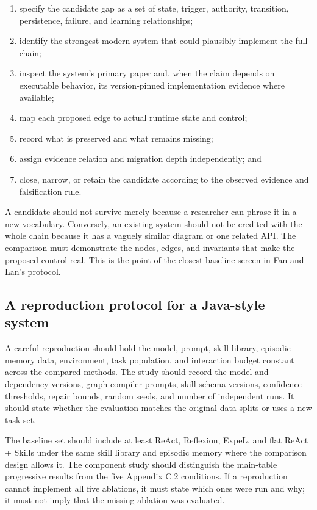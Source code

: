 \begin{enumerate}
  \item specify the candidate gap as a set of state, trigger, authority, transition, persistence, failure, and learning relationships;
  \item identify the strongest modern system that could plausibly implement the full chain;
  \item inspect the system's primary paper and, when the claim depends on executable behavior, its version-pinned implementation evidence where available;
  \item map each proposed edge to actual runtime state and control;
  \item record what is preserved and what remains missing;
  \item assign evidence relation and migration depth independently; and
  \item close, narrow, or retain the candidate according to the observed evidence and falsification rule.
\end{enumerate}

A candidate should not survive merely because a researcher can phrase it in a new vocabulary. Conversely, an existing system should not be credited with the whole chain because it has a vaguely similar diagram or one related API. The comparison must demonstrate the nodes, edges, and invariants that make the proposed control real. This is the point of the closest-baseline screen in Fan and Lan's protocol.

\subsection{A reproduction protocol for a Java-style system}

A careful reproduction should hold the model, prompt, skill library, episodic-memory data, environment, task population, and interaction budget constant across the compared methods. The study should record the model and dependency versions, graph compiler prompts, skill schema versions, confidence thresholds, repair bounds, random seeds, and number of independent runs. It should state whether the evaluation matches the original data splits or uses a new task set.

The baseline set should include at least ReAct, Reflexion, ExpeL, and flat ReAct + Skills under the same skill library and episodic memory where the comparison design allows it. The component study should distinguish the main-table progressive results from the five Appendix C.2 conditions. If a reproduction cannot implement all five ablations, it must state which ones were run and why; it must not imply that the missing ablation was evaluated.\autocite{xia2026grasp}

